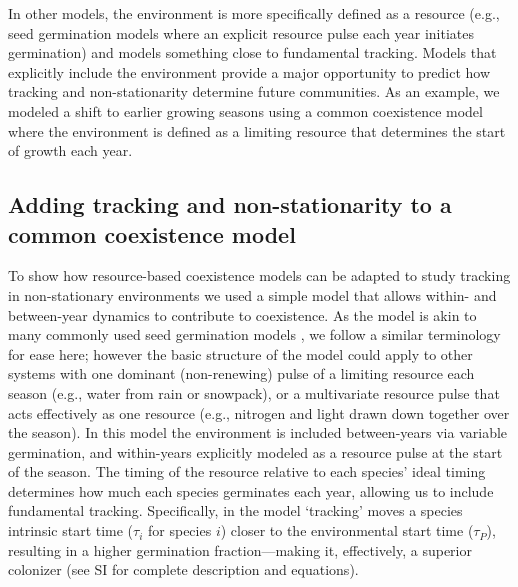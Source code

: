 \documentclass[11pt,letterpaper]{article}
\begin{document}
In other models, the environment is more specifically defined as a resource (e.g., seed germination models where an explicit resource pulse each year initiates germination) and models something close to fundamental tracking. Models that explicitly include the environment provide a major opportunity to predict how tracking and non-stationarity determine future communities. As an example, we modeled a shift to earlier growing seasons using a common coexistence model where the environment is defined as a limiting resource that determines the start of growth each year.

\subsection{Adding tracking and non-stationarity to a common coexistence model} 
To show how resource-based coexistence models can be adapted to study tracking in non-stationary environments we used a simple model that allows within- and between-year dynamics to contribute to coexistence. As the model is akin to many commonly used seed germination models \citep{Chesson:2004eo}, we follow a similar terminology for ease here; however the basic structure of the model could apply to other systems with one dominant (non-renewing) pulse of a limiting resource each season (e.g., water from rain or snowpack), or a multivariate resource pulse that acts effectively as one resource (e.g., nitrogen and light drawn down together over the season). In this model the environment is included between-years via variable germination, and within-years explicitly modeled as a resource pulse at the start of the season. The timing of the resource relative to each species' ideal timing determines how much each species germinates each year, allowing us to include fundamental tracking. Specifically, in the model `tracking' moves a species intrinsic start time ($\tau_i$ for species $i$) closer to the environmental start time  ($\tau_P$), resulting in a higher germination fraction---making it, effectively, a superior colonizer (see SI for complete description and equations).%
\end{document}
